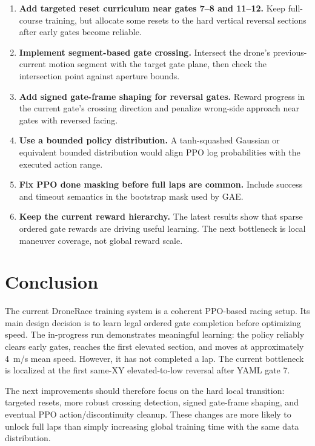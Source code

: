 \documentclass[11pt]{article}
\begin{document}
\begin{enumerate}
  \item \textbf{Add targeted reset curriculum near gates 7--8 and 11--12.}
  Keep full-course training, but allocate some resets to the hard vertical
  reversal sections after early gates become reliable.

  \item \textbf{Implement segment-based gate crossing.} Intersect the drone's
  previous-current motion segment with the target gate plane, then check the
  intersection point against aperture bounds.

  \item \textbf{Add signed gate-frame shaping for reversal gates.} Reward
  progress in the current gate's crossing direction and penalize wrong-side
  approach near gates with reversed facing.

  \item \textbf{Use a bounded policy distribution.} A tanh-squashed Gaussian or
  equivalent bounded distribution would align PPO log probabilities with the
  executed action range.

  \item \textbf{Fix PPO done masking before full laps are common.} Include
  success and timeout semantics in the bootstrap mask used by GAE.

  \item \textbf{Keep the current reward hierarchy.} The latest results show that
  sparse ordered gate rewards are driving useful learning. The next bottleneck
  is local maneuver coverage, not global reward scale.
\end{enumerate}

\section{Conclusion}

The current DroneRace training system is a coherent PPO-based racing setup. Its
main design decision is to learn legal ordered gate completion before optimizing
speed. The in-progress run demonstrates meaningful learning: the policy
reliably clears early gates, reaches the first elevated section, and moves at
approximately \SI{4}{m/s} mean speed. However, it has not completed a lap. The
current bottleneck is localized at the first same-XY elevated-to-low reversal
after YAML gate 7.

The next improvements should therefore focus on the hard local transition:
targeted resets, more robust crossing detection, signed gate-frame shaping, and
eventual PPO action/discontinuity cleanup. These changes are more likely to
unlock full laps than simply increasing global training time with the same data
distribution.
\end{document}
